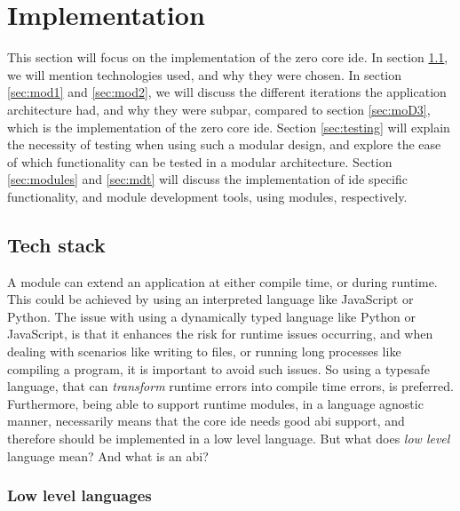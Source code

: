 \chapter{Implementation} \label{cha:impl}

This section will focus on the implementation of the zero core \gls*{ide}. In
section \ref{sec:stack}, we will mention technologies used, and why they were
chosen. In section \ref{sec:mod1} and \ref{sec:mod2}, we will discuss the
different iterations the application architecture had, and why they were subpar,
compared to section \ref{sec:moD3}, which is the implementation of the zero core
\gls*{ide}. Section \ref{sec:testing} will explain the necessity of testing when
using such a modular design, and explore the ease of which functionality can be
tested in a modular architecture. Section \ref{sec:modules} and \ref{sec:mdt}
will discuss the implementation of \gls{ide} specific functionality, and
module development tools, using modules, respectively.

\section{Tech stack} \label{sec:stack}

A module can extend an application at either compile time, or during runtime.
This could be achieved by using an interpreted language like JavaScript or
Python. The issue with using a dynamically typed language like Python or
JavaScript, is that it enhances the risk for runtime issues occurring, and when
dealing with scenarios like writing to files, or running long processes like
compiling a program, it is important to avoid such issues. So using a typesafe
language, that can \textit{transform} runtime errors into compile time errors,
is preferred. Furthermore, being able to support runtime modules, in a language
agnostic manner, necessarily means that the core \gls*{ide} needs good
\gls*{abi} support, and therefore should be implemented in a low level language.
But what does \textit{low level} language mean? And what is an \gls*{abi}?

\subsection{Low level languages}

